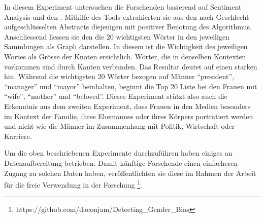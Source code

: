 In diesem Experiment untersuchen die Forschenden basierend auf Sentiment Analysis und  den .
Mithilfe des Tools  extrahierten sie aus den nach Geschlecht aufgeschlüsselten Abstracts diejenigen mit positiver Benotung des Algorithmus.
Anschliessend liessen sie den  die 20 wichtigsten Wörter in den jeweiligen Sammlungen als Graph darstellen. In diesem ist die Wichtigkeit des
jeweiligen Wortes als Grösse der Knoten ersichtlich. Wörter, die in denselben Kontexten vorkommen sind durch Kanten verbunden.
Das Resultat deutet auf einen starken  hin. Während die wichtigsten 20 Wörter bezogen auf Männer \enquote{president},
\enquote{manager} und \enquote{mayor} beinhalten, beginnt die Top 20 Liste bei den Frauen mit \enquote{wife}, \enquote{mother} und \enquote{beloved}.
Dieses Experiment stützt also auch die Erkenntnis aus dem zweiten Experiment, dass Frauen in den Medien besonders im Kontext der Familie,
ihres Ehemannes oder ihres Körpers porträtiert werden und nicht wie die Männer im Zusammenhang mit Politik, Wirtschaft oder Karriere.

Um die oben beschriebenen Experimente durchzuführen haben \citeauthor{does-gender-matter-in-the-news} einiges an Datenaufbereitung betrieben.
Damit künftige Forschende einen einfacheren Zugang zu solchen Daten haben, veröffentlichten sie diese im Rahmen der Arbeit für die freie Verwendung
in der Forschung \footnote{https://github.com/daconjam/Detecting\_Gender\_Bias}.



